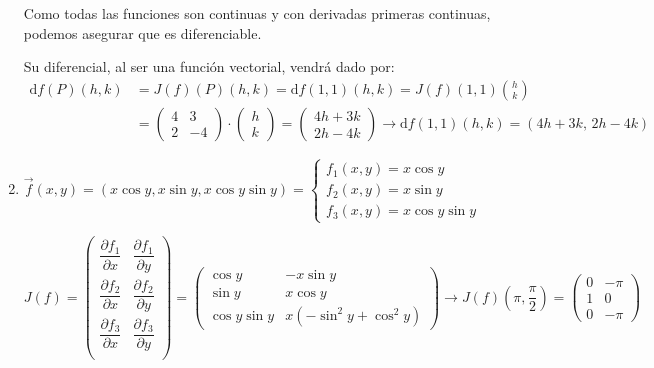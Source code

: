 \begin{enumerate}[label=\color{red}\textbf{\arabic*)}, leftmargin=*]
Como todas las funciones son continuas y con derivadas primeras continuas, podemos asegurar que es diferenciable.

Su diferencial, al ser una función vectorial, vendrá dado por:
\[ \begin{aligned}
\mathrm{d}f(P)(h,k)&=J(f)(P)(h,k)=\mathrm{d}f(1,1)(h,k)=J(f)(1,1)\binom{h}{k}\\
&=\begin{pmatrix}
4 & 3 \\
2 & -4
\end{pmatrix}\cdot\begin{pmatrix}
h\\
k
\end{pmatrix}=\begin{pmatrix}
4h+3k\\
2h-4k
\end{pmatrix}\longrightarrow \mathrm{d}f(1,1)(h,k)=(4h+3k,\,2h-4k)
\end{aligned} \]

\item {}

$\vec{f}(x,y)=(x\cos y,x\sin y,x\cos y\sin y)=\begin{cases}
f_{1}(x,y)=x\cos y\\
f_{2}(x,y)=x\sin y\\
f_{3}(x,y)=x\cos y\sin y
\end{cases}$

$J(f)=\begin{pmatrix}
\dfrac{\partial f_{1}}{\partial x} & \dfrac{\partial f_1}{\partial y} \\ 
\dfrac{\partial f_{2}}{\partial x} & \dfrac{\partial f_2}{\partial y} \\ 
\dfrac{\partial f_{3}}{\partial x} & \dfrac{\partial f_3}{\partial y} \\ 
\end{pmatrix}=\begin{pmatrix}
\cos y & -x\sin y \\ 
\sin y & x\cos y \\ 
\cos y\sin y & x(-\sin^{2}y+\cos^{2}y)
\end{pmatrix}\longrightarrow J(f)\left(\pi,\dfrac{\pi}{2}\right)=\begin{pmatrix}
0 & -\pi \\ 
1 & 0 \\ 
0 & -\pi
\end{pmatrix}  $


\end{enumerate}
